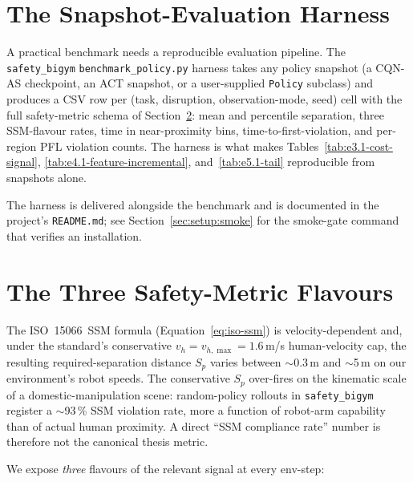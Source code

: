 \documentclass[11pt,a4paper]{report}
\newcommand{\ssm}{SSM}
\newcommand{\pfl}{PFL}
\newcommand{\iso}{ISO~15066}
\newcommand{\sbigym}{\texttt{safety\_bigym}}
\newcommand{\cqnas}{CQN-AS}
\begin{document}
\section{The Snapshot-Evaluation Harness}
\label{sec:bench:harness}

A practical benchmark needs a reproducible evaluation pipeline. The
\sbigym{} \texttt{benchmark\_policy.py} harness takes any policy
snapshot (a \cqnas{} checkpoint, an ACT snapshot, or a user-supplied
\texttt{Policy} subclass) and produces a CSV row per (task,
disruption, observation-mode, seed) cell with the full safety-metric
schema of Section~\ref{sec:bench:metrics:flavours}: mean and
percentile separation, three SSM-flavour rates, time in
near-proximity bins, time-to-first-violation, and per-region
\pfl{} violation counts. The harness is what makes Tables~\ref{tab:e3.1-cost-signal},
\ref{tab:e4.1-feature-incremental}, and~\ref{tab:e5.1-tail}
reproducible from snapshots alone.

The harness is delivered alongside the benchmark and is documented
in the project's \texttt{README.md}; see
Section~\ref{sec:setup:smoke} for the smoke-gate command that
verifies an installation.



\section{The Three Safety-Metric Flavours}
\label{sec:bench:metrics:flavours}

The \iso{}~\ssm{} formula (Equation~\ref{eq:iso-ssm}) is
velocity-dependent and, under the standard's conservative
$v_h = v_{h,\max} = 1.6$\,m/s human-velocity cap, the resulting
required-separation distance $S_p$ varies between $\sim$0.3\,m and
$\sim$5\,m on our environment's robot speeds. The conservative
$S_p$ over-fires on the kinematic scale of a domestic-manipulation
scene: random-policy rollouts in \sbigym{} register a $\sim$93\,\%
\ssm{} violation rate, more a function of robot-arm capability than
of actual human proximity. A direct ``\ssm{} compliance rate''
number is therefore not the canonical thesis metric.

We expose \emph{three} flavours of the relevant signal at every
env-step:
\end{document}
